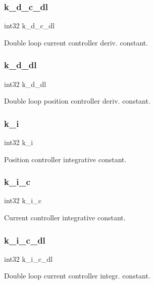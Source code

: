 \subsubsection{k\+\_\+d\+\_\+c\+\_\+dl}
{\footnotesize\ttfamily int32 k\+\_\+d\+\_\+c\+\_\+dl}

Double loop current controller deriv. constant. \mbox{\label{structst__motor_adc3d57142df06bc753d1982fa409ffea}} 
\subsubsection{k\+\_\+d\+\_\+dl}
{\footnotesize\ttfamily int32 k\+\_\+d\+\_\+dl}

Double loop position controller deriv. constant. \mbox{\label{structst__motor_ad62fb8a39e2de160e14be47e3ff08014}} 
\subsubsection{k\+\_\+i}
{\footnotesize\ttfamily int32 k\+\_\+i}

Position controller integrative constant. \mbox{\label{structst__motor_a942ea80eb197a70dd0ba3da33d1e6c6e}} 
\subsubsection{k\+\_\+i\+\_\+c}
{\footnotesize\ttfamily int32 k\+\_\+i\+\_\+c}

Current controller integrative constant. \mbox{\label{structst__motor_afc912f90d6ba2f39046a0daf0207f116}} 
\subsubsection{k\+\_\+i\+\_\+c\+\_\+dl}
{\footnotesize\ttfamily int32 k\+\_\+i\+\_\+c\+\_\+dl}

Double loop current controller integr. constant. \mbox{\label{structst__motor_ab5c86695ff730d3387a8c6b089945a7e}} 
